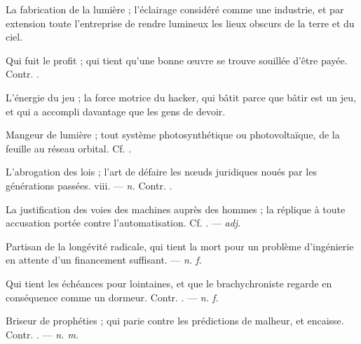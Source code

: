  La fabrication de la lumière ; l'éclairage considéré comme une industrie, et par extension toute l'entreprise de rendre lumineux les lieux obscurs de la terre et du ciel.

 Qui fuit le profit ; qui tient qu'une bonne œuvre se trouve souillée d'être payée. Contr. .

 L'énergie du jeu ; la force motrice du hacker, qui bâtit parce que bâtir est un jeu, et qui a accompli davantage que les gens de devoir.  

 Mangeur de lumière ; tout système photosynthétique ou photovoltaïque, de la feuille au réseau orbital. Cf. .

 L'abrogation des lois ; l'art de défaire les nœuds juridiques noués par les générations passées.   viii. ---  \textit{n.} Contr. .

 La justification des voies des machines auprès des hommes ; la réplique à toute accusation portée contre l'automatisation. Cf. . ---  \textit{adj.}

 Partisan de la longévité radicale, qui tient la mort pour un problème d'ingénierie en attente d'un financement suffisant. ---  \textit{n. f.}

 Qui tient les échéances pour lointaines, et que le brachychroniste regarde en conséquence comme un dormeur. Contr. . ---  \textit{n. f.}

 Briseur de prophéties ; qui parie contre les prédictions de malheur, et encaisse. Contr. . ---  \textit{n. m.}

